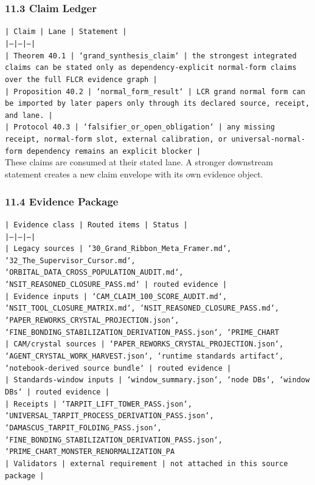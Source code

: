 \documentclass[11pt]{article}
\begin{document}
\subsubsection*{11.3 Claim Ledger}

\noindent\texttt{| Claim | Lane | Statement |}\\
\noindent\texttt{|---|---|---|}\\
\noindent\texttt{| Theorem 40.1 | `grand\_synthesis\_claim` | the strongest integrated claims can be stated only as dependency-explicit normal-form claims over the full FLCR evidence graph |}\\
\noindent\texttt{| Proposition 40.2 | `normal\_form\_result` | LCR grand normal form can be imported by later papers only through its declared source, receipt, and lane. |}\\
\noindent\texttt{| Protocol 40.3 | `falsifier\_or\_open\_obligation` | any missing receipt, normal-form slot, external calibration, or universal-normal-form dependency remains an explicit blocker |}\\

These claims are consumed at their stated lane. A stronger downstream statement
creates a new claim envelope with its own evidence object.

\subsubsection*{11.4 Evidence Package}

\noindent\texttt{| Evidence class | Routed items | Status |}\\
\noindent\texttt{|---|---|---|}\\
\noindent\texttt{| Legacy sources | `30\_Grand\_Ribbon\_Meta\_Framer.md`, `32\_The\_Supervisor\_Cursor.md`, `ORBITAL\_DATA\_CROSS\_POPULATION\_AUDIT.md`, `NSIT\_REASONED\_CLOSURE\_PASS.md` | routed evidence |}\\
\noindent\texttt{| Evidence inputs | `CAM\_CLAIM\_100\_SCORE\_AUDIT.md`, `NSIT\_TOOL\_CLOSURE\_MATRIX.md`, `NSIT\_REASONED\_CLOSURE\_PASS.md`, `PAPER\_REWORKS\_CRYSTAL\_PROJECTION.json`, `FINE\_BONDING\_STABILIZATION\_DERIVATION\_PASS.json`, `PRIME\_CHART}\\
\noindent\texttt{| CAM/crystal sources | `PAPER\_REWORKS\_CRYSTAL\_PROJECTION.json`, `AGENT\_CRYSTAL\_WORK\_HARVEST.json`, `runtime standards artifact`, `notebook-derived source bundle` | routed evidence |}\\
\noindent\texttt{| Standards-window inputs | `window\_summary.json`, `node DBs`, `window DBs` | routed evidence |}\\
\noindent\texttt{| Receipts | `TARPIT\_LIFT\_TOWER\_PASS.json`, `UNIVERSAL\_TARPIT\_PROCESS\_DERIVATION\_PASS.json`, `DAMASCUS\_TARPIT\_FOLDING\_PASS.json`, `FINE\_BONDING\_STABILIZATION\_DERIVATION\_PASS.json`, `PRIME\_CHART\_MONSTER\_RENORMALIZATION\_PA}\\
\noindent\texttt{| Validators | external requirement | not attached in this source package |}\\
\end{document}
